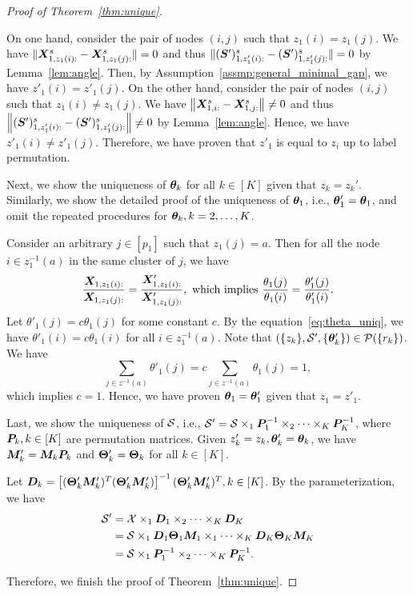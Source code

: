 \documentclass[lettersize,onecolumn,journal]{IEEEtran}
\theoremstyle{definition}
\theoremstyle{definition}
\newcommand{\off}[1]{\left[#1\right]}
\begin{document}
\begin{proof}[Proof of Theorem~\ref{thm:unique}]
\begin{enumerate}
On one hand, consider the pair of nodes $(i,j)$ such that $z_1(i) = z_1(j)$. We have $\lVert\bm X_{1, z_1(i):}^s - \bm X_{1, z_1(j):}^s \rVert = 0$ and thus $\lVert (\bm S')_{1, z'_1(i):}^{s} - (\bm S')_{1, z'_1(j):}^{s} \rVert = 0$ by Lemma~\ref{lem:angle}. Then, by Assumption~\eqref{assmp:general_minimal_gap}, we have $z'_1(i) = z'_1(j)$. On the other hand, consider the pair of nodes $(i,j)$ such that $z_1(i) \neq z_1(j)$. We have $ \left\lVert\bm X_{1,i:}^s - \bm X_{1,j:}^s\right\rVert \neq 0$ and thus $\left\lVert (\bm S')_{1, z'_1(i):}^{s} - (\bm S')_{1, z'_1(j):}^{s} \right\rVert \neq 0$ by Lemma~\ref{lem:angle}. Hence, we have $z'_1(i) \neq z'_1(j)$. Therefore, we have proven that $z'_1$ is equal to $z_i$ up to label permutation.

Next, we show the uniqueness of $\boldsymbol{\theta}_k$ for all $k \in [K]$ given that $z_k = z_k'$. Similarly, we show the detailed proof of the uniqueness of $\boldsymbol{\theta}_1$, i.e., $\boldsymbol{\theta}'_1 = \boldsymbol{\theta}_1$, and omit the repeated procedures for $\boldsymbol{\theta}_k, k = 2,\ldots, K$.

Consider an arbitrary $j \in [p_1]$ such that $z_1(j) = a$. Then for all the node $i \in  z_1^{-1}(a)$ in the same cluster of $j$, we have 
\begin{equation}
    \frac{\mX_{1,z_1(i):}}{\mX_{1,z_1(j):}} = \frac{\mX'_{1,z_1(i):}}{\mX'_{1,z_1(j):}}, \text{ which implies }  \frac{\theta_1(j)}{\theta_1(i)} = \frac{\theta'_1(j)}{\theta'_1(i)}.\label{eq:theta_uniq}
\end{equation}
Let $\theta'_1(j) = c\theta_1(j)$ for some constant $c$. By the equation~\eqref{eq:theta_uniq}, we have $\theta'_1(i) = c \theta_1(i)$ for all $ i \in  z_1^{-1}(a)$. Note that $(\{z_k\}, \mathcal{S}', \{\boldsymbol{\theta}'_k\}) \in \mathcal{P}(\{r_k\})$. We have 
\begin{equation}
    \sum_{j \in z^{-1}(a)} \theta'_1(j) = c \sum_{j \in z^{-1}(a)} \theta_1(j) = 1,
\end{equation}
which implies $c = 1$. Hence, we have proven $\boldsymbol{\theta}_1 = \boldsymbol{\theta}'_1$ given that $z_1 = z'_1$.

Last, we show the uniqueness of $\mathcal{S}$, i.e., $\mathcal{S}'=\mathcal{S}\times_1 \bm{P}^{-1}_1\times_2\cdots \times_K \bm{P}^{-1}_K$, where $\bm{P}_k, k \in [K]$ are permutation matrices.  Given $z'_k = z_k, \boldsymbol{\theta}'_k = \boldsymbol{\theta}_k$, we have $\bm M'_k = \bm M_k \bm{P}_k$ and $\boldsymbol{\Theta}'_k = \boldsymbol{\Theta}_k$ for all $k \in [K]$. 

Let $\mD_k = \off{ (\mTheta'_k \mM'_k)^T (\mTheta'_k \mM'_k) }^{-1} (\mTheta'_k \mM'_k)^T, k \in [K]$. By the parameterization, we have 
\begin{align}
    \mathcal{S}' &= \mathcal{X} \times_1 \bm{D}_1 \times_2 \cdots \times_K \bm{D}_K \\
    &= \mathcal{S} \times_1 \bm{D}_1 \boldsymbol{\Theta}_1 \bm M_1 \times_1 \cdots \times_K \bm{D}_K \boldsymbol{\Theta}_K \bm M_K \\
    &= \mathcal{S} \times_1 \bm{P}^{-1}_1 \times_2 \cdots \times_K \bm{P}^{-1}_K.
\end{align}


\end{enumerate}

Therefore, we finish the proof of Theorem~\ref{thm:unique}.
\end{proof}
\end{document}
